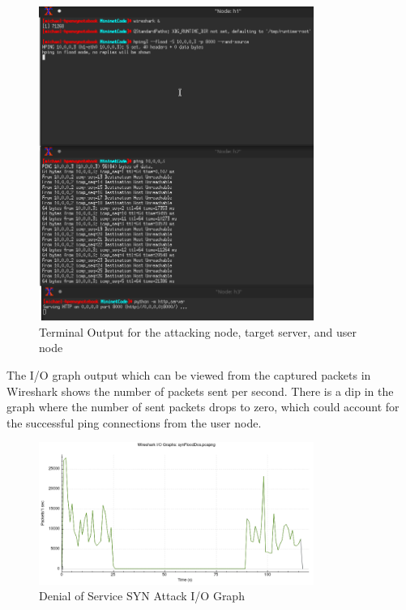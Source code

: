 \begin{figure}[H]
	\centering
	\includegraphics[width=0.8\textwidth]{images/synFloodResults}
	\caption{Terminal Output for the attacking node, target server, and user
	node}
	\label{fig:images-synFloodResults}
\end{figure}

The I/O graph output which can be viewed from the captured packets in Wireshark
shows the number of packets sent per second. There is a dip in the graph where
the number of sent packets drops to zero, which could account for the successful
ping connections from the user node.

\begin{figure}[H]
	\centering
	\includegraphics[width=0.8\textwidth]{images/synFloodDosIOGraph}
	\caption{Denial of Service SYN Attack I/O Graph}
	\label{fig:images-synFloodDosIOGraph}
\end{figure}

